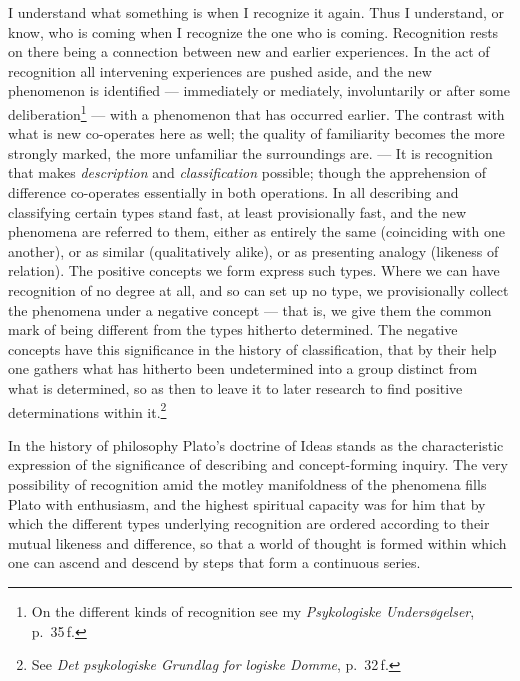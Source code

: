 \documentclass[12pt,a4paper]{book}
\newcommand{\opage}[1]{\marginnote{\footnotesize\textit{[#1]}}}
\begin{document}
I understand what something is when I recognize it again. Thus I understand, or
know, who is coming when I recognize the one who is coming. Recognition rests on
there being a connection between new and earlier experiences. In the act of
recognition all intervening experiences are pushed aside, and the new phenomenon
is identified --- immediately or mediately, involuntarily or after some
deliberation\footnote{On the different kinds of recognition see my
\textit{Psykologiske Undersøgelser}, p.~35\,f.} --- with a phenomenon that has
occurred earlier. The contrast with what is new co-operates here as well; the
quality of familiarity becomes the more strongly marked, the more unfamiliar the
surroundings are. --- It is recognition that makes \emph{description} and
\emph{classification} possible; though the apprehension of difference
co-operates essentially in both operations. In all describing and classifying
certain types stand fast, at least provisionally fast, and the new phenomena are
referred to them, either as entirely the same (coinciding with one another), or
as similar (qualitatively alike), or as presenting analogy (likeness of
relation). The positive concepts we form express such types. Where we can have
recognition of no degree at all, and so can \opage{29}set up no type, we provisionally
collect the phenomena under a negative concept --- that is, we give them the
common mark of being different from the types hitherto determined. The negative
concepts have this significance in the history of classification, that by their
help one gathers what has hitherto been undetermined into a group distinct from
what is determined, so as then to leave it to later research to find positive
determinations within it.\footnote{See \textit{Det psykologiske Grundlag for
logiske Domme}, p.~32\,f.}

In the history of philosophy Plato's doctrine of Ideas stands as the
characteristic expression of the significance of describing and concept-forming
inquiry. The very possibility of recognition amid the motley manifoldness of the
phenomena fills Plato with enthusiasm, and the highest spiritual capacity was
for him that by which the different types underlying recognition are ordered
according to their mutual likeness and difference, so that a world of thought is
formed within which one can ascend and descend by steps that form a continuous
series.
\end{document}
